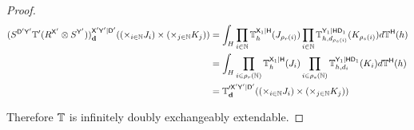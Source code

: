 \begin{proof}
\begin{align}
  (S^{\mathsf{D'}\mathsf{Y'}}\mathbb{T}'(R^{\mathsf{X'}}\otimes S^{\mathsf{Y}'}))^{\mathsf{X}'\mathsf{Y}'|\mathsf{D}'}_{\mathbf{d}}((\times_{i\in \mathbb{N}}J_i)\times (\times_{j\in \mathbb{N}} K_j)) &= \int_{H} \prod_{i\in \mathbb{N}} \mathbb{T}^{\mathsf{X}_1|\mathsf{H}}_h(J_{\rho_r(i)})\prod_{i\in \mathbb{N}}\mathbb{T}_{h,d_{\rho_s(i)}}^{\mathsf{Y}_1|\mathsf{H}\mathsf{D}_1}(K_{\rho_s(i)})d\mathbb{T}^{\mathsf{H}}(h) \\
                            &= \int_{H} \prod_{i\in \rho_{r}(\mathbb{N})} \mathbb{T}^{\mathsf{X}_1|\mathsf{H}}_h(J_{i})\prod_{i\in \rho_s(\mathbb{N})}\mathbb{T}_{h,d_{i}}^{\mathsf{Y}_1|\mathsf{H}\mathsf{D}_1}(K_{i})d\mathbb{T}^{\mathsf{H}}(h) \\
                            &= \mathbb{T}^{\prime \mathsf{X}'\mathsf{Y}'|\mathsf{D}'}_{\mathbf{d}}((\times_{i\in \mathbb{N}}J_i)\times (\times_{j\in \mathbb{N}} K_j))
\end{align}

Therefore $\mathbb{T}$ is infinitely doubly exchangeably extendable.
\end{proof}
